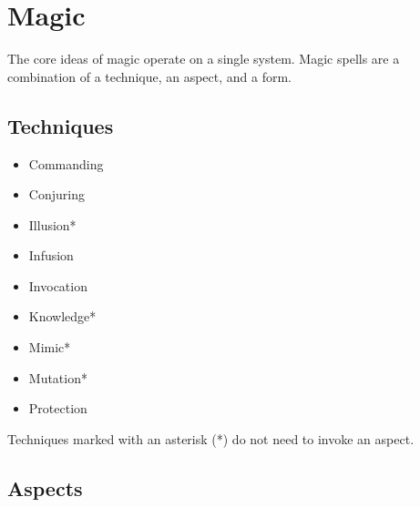 \documentclass[]{article}
\date{}
\providecommand{\tightlist}{%
  \setlength{\itemsep}{0pt}\setlength{\parskip}{0pt}}
\begin{document}
\section{Magic}\label{magic}

The core ideas of magic operate on a single system. Magic spells are a
combination of a technique, an aspect, and a form.

\subsection{Techniques}\label{techniques}

\begin{itemize}
\tightlist
\item
  Commanding
\item
  Conjuring
\item
  Illusion*
\item
  Infusion
\item
  Invocation
\item
  Knowledge*
\item
  Mimic*
\item
  Mutation*
\item
  Protection
\end{itemize}

Techniques marked with an asterisk (*) do not need to invoke an aspect.

\subsection{Aspects}\label{aspects}
\end{document}
